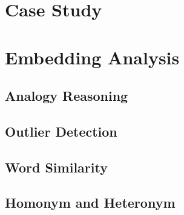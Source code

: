 \hspace{24pt}


\section{Case Study} \label{sec:case_study}


\section{Embedding Analysis} \label{sec:analysis}


\subsection{Analogy Reasoning} \label{sec:analysis_analogy}


\subsection{Outlier Detection} \label{sec:analysis_outlier}


\subsection{Word Similarity} \label{sec:analysis_similarity}


\subsection{Homonym and Heteronym} \label{sec:analysis_homonym_heteronym}

